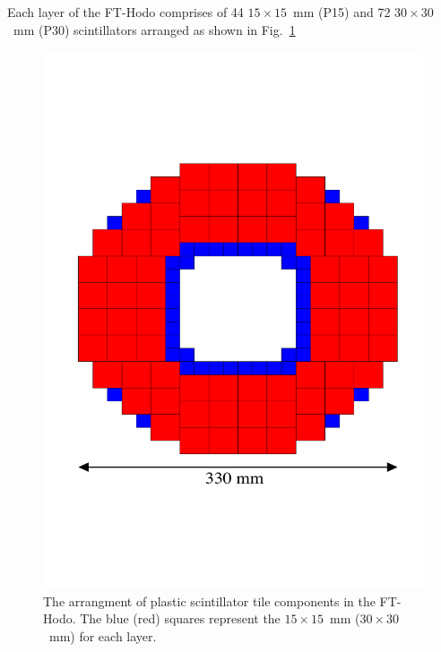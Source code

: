Each layer of the FT-Hodo comprises of 44 $15\times 15$~mm (P15) and 72 $30\times 30$~mm (P30) scintillators arranged as shown in Fig.~\ref{Fig:FTHodoLayout}  
\begin{figure}[th!]
\centering 
\includegraphics[width=0.85\columnwidth]{./fig/FTHodoLayout.pdf} 
\caption{The arrangment of plastic scintillator tile components in the FT-Hodo. The blue (red) squares represent the $15\times 15$~mm ($30\times 30$~mm) for each layer. } 
\label{Fig:FTHodoLayout} 
\end{figure}
